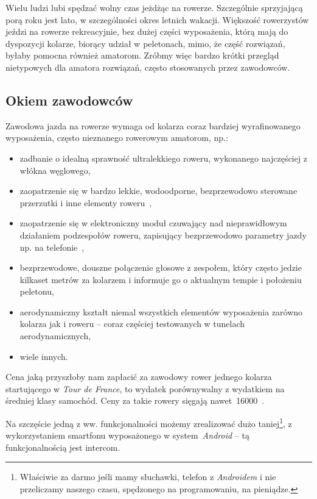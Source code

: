 \documentclass{article}
\begin{document}
Wielu ludzi lubi spędzać wolny czas jeżdżąc na rowerze. Szczególnie sprzyjającą porą roku jest lato, w szczególności okres letnich wakacji. Większość rowerzystów jeździ na rowerze rekreacyjnie, bez dużej części wyposażenia, którą mają do dyspozycji kolarze, biorący udział w peletonach, mimo, że część rozwiązań, byłaby pomocna również amatorom. Zróbmy więc bardzo krótki przegląd nietypowych dla amatora rozwiązań, często stosowanych przez zawodowców.


\subsection{Okiem zawodowców}

Zawodowa jazda na rowerze wymaga od kolarza coraz bardziej wyrafinowanego wyposażenia, często nieznanego rowerowym amatorom, np.:
\begin{itemize}
\item zadbanie o idealną sprawność ultralekkiego roweru, wykonanego najczęściej z włókna węglowego,
\item zaopatrzenie się w bardzo lekkie, wodoodporne, bezprzewodowo sterowane przerzutki i inne elementy roweru~\cite{www:campagnolo-shifts,www:campagnolo-shifts-video},
\item zaopatrzenie się w elektroniczny moduł czuwający nad nieprawidłowym działaniem podzespołów roweru, zapisujący bezprzewodowo parametry jazdy np. na telefonie~\cite{www:campagnolo-computer,www:campagnolo-computer-video,www:campagnolo-computer-adjustment-video},
\item bezprzewodowe, douszne połączenie głosowe z zespołem, który często jedzie kilkaset metrów za kolarzem i informuje go o aktualnym tempie i położeniu peletonu,
\item aerodynamiczny kształt niemal wszystkich elementów wyposażenia zarówno kolarza jak i roweru -- coraz częściej testowanych w tunelach aerodynamicznych,
\item wiele innych.
\end{itemize}
Cena jaką przyszłoby nam zapłacić za zawodowy rower jednego kolarza startującego w \emph{Tour de France}, to wydatek porównywalny z wydatkiem na średniej klasy samochód. Ceny za takie rowery sięgają nawet~16000\textsterling~\cite{www:racing-bikes,www:tdf-bike}.

Na szczęście jedną z ww. funkcjonalności możemy zrealizować dużo taniej\footnote{Właściwie za darmo jeśli mamy słuchawki, telefon z \emph{Androidem} i nie przeliczamy naszego czasu, spędzonego na programowaniu, na pieniądze.}, z wykorzystaniem smartfonu wyposażonego w system~\emph{Android} -- tą funkcjonalnością jest intercom.
\end{document}
